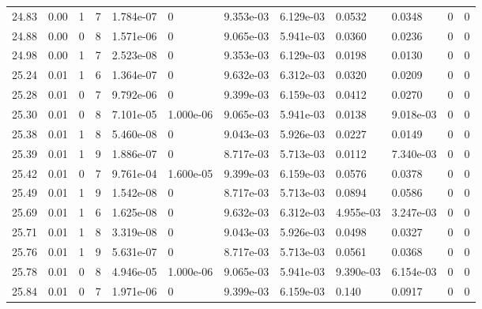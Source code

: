 \documentclass[preview]{standalone}
\begin{document}
{{{{{{{{{\begin{tabular}{L{1.2cm}C{1.2cm} C{0.3cm}C{0.5cm} C{1.4cm}C{1.4cm} C{1.4cm}C{1.4cm} C{1.6cm}C{1.6cm} C{1.6cm}C{1.6cm}}
  24.83  &  0.00  & 1     &  7 &  1.784e-07  & 0  &  9.353e-03&   6.129e-03& 0.0532 & 0.0348   &  0 & 0  \\ 
  24.88  &  0.00  & 0     &  8 &  1.571e-06  & 0  &  9.065e-03&   5.941e-03& 0.0360 & 0.0236   &  0 & 0  \\ 
  24.98  &  0.00  & 1     &  7 &  2.523e-08  & 0  &  9.353e-03&   6.129e-03& 0.0198 & 0.0130   &  0 & 0  \\ 
  25.24  &  0.01  & 1     &  6 &  1.364e-07  & 0  &  9.632e-03&   6.312e-03& 0.0320 & 0.0209   &  0 & 0  \\ 
  25.28  &  0.01  & 0     &  7 &  9.792e-06  & 0  &  9.399e-03&   6.159e-03& 0.0412 & 0.0270   &  0 & 0  \\ 
  25.30  &  0.01  & 0     &  8 &  7.101e-05  & 1.000e-06  &  9.065e-03&   5.941e-03& 0.0138 & 9.018e-03   &  0 & 0  \\ 
  25.38  &  0.01  & 1     &  8 &  5.460e-08  & 0  &  9.043e-03&   5.926e-03& 0.0227 & 0.0149   &  0 & 0  \\ 
  25.39  &  0.01  & 1     &  9 &  1.886e-07  & 0  &  8.717e-03&   5.713e-03& 0.0112 & 7.340e-03   &  0 & 0  \\ 
  25.42  &  0.01  & 0     &  7 &  9.761e-04  & 1.600e-05  &  9.399e-03&   6.159e-03& 0.0576 & 0.0378   &  0 & 0  \\ 
  25.49  &  0.01  & 1     &  9 &  1.542e-08  & 0  &  8.717e-03&   5.713e-03& 0.0894 & 0.0586   &  0 & 0  \\ 
  25.69  &  0.01  & 1     &  6 &  1.625e-08  & 0  &  9.632e-03&   6.312e-03& 4.955e-03 & 3.247e-03   &  0 & 0  \\ 
  25.71  &  0.01  & 1     &  8 &  3.319e-08  & 0  &  9.043e-03&   5.926e-03& 0.0498 & 0.0327   &  0 & 0  \\ 
  25.76  &  0.01  & 1     &  9 &  5.631e-07  & 0  &  8.717e-03&   5.713e-03& 0.0561 & 0.0368   &  0 & 0  \\ 
  25.78  &  0.01  & 0     &  8 &  4.946e-05  & 1.000e-06  &  9.065e-03&   5.941e-03& 9.390e-03 & 6.154e-03   &  0 & 0  \\ 
  25.84  &  0.01  & 0     &  7 &  1.971e-06  & 0  &  9.399e-03&   6.159e-03& 0.140 & 0.0917   &  0 & 0  \\ 
\hline 
\end{tabular} 

}}}}}}}}}
\end{document}
